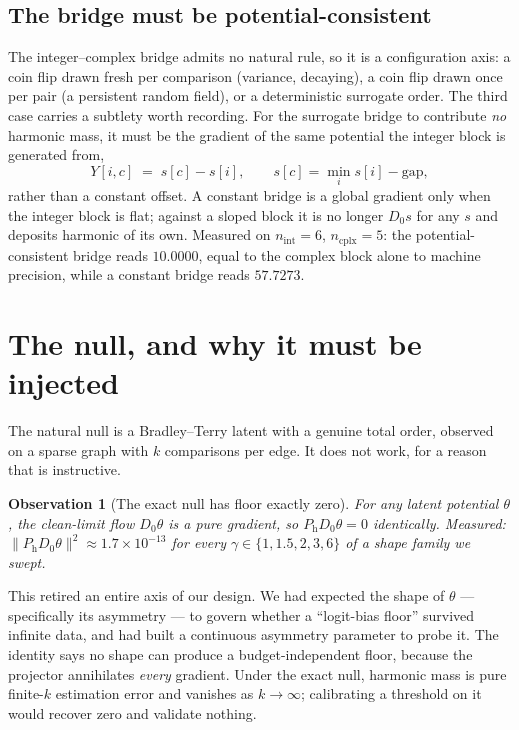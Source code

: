 \documentclass[11pt,a4paper]{article}
\newtheorem{observation}{Observation}
\newcommand{\Ph}{P_{\mathrm{h}}}
\begin{document}
\subsection{The bridge must be potential-consistent}\label{subsec:bridgepc}

The integer--complex bridge admits no natural rule, so it is a configuration
axis: a coin flip drawn fresh per comparison (variance, decaying), a coin flip
drawn once per pair (a persistent random field), or a deterministic surrogate
order. The third case carries a subtlety worth recording. For the surrogate
bridge to contribute \emph{no} harmonic mass, it must be the gradient of the same
potential the integer block is generated from,
\[
Y[i,c] \;=\; s[c] - s[i], \qquad s[c] = \min_i s[i] - \text{gap},
\]
rather than a constant offset. A constant bridge is a global gradient only when
the integer block is flat; against a sloped block it is no longer $D_0 s$ for any
$s$ and deposits harmonic of its own. Measured on $n_{\mathrm{int}}=6$,
$n_{\mathrm{cplx}}=5$: the potential-consistent bridge reads $10.0000$, equal to
the complex block alone to machine precision, while a constant bridge reads
$57.7273$.

\section{The null, and why it must be injected}\label{sec:null}

The natural null is a Bradley--Terry latent with a genuine total order, observed
on a sparse graph with $k$ comparisons per edge. It does not work, for a reason
that is instructive.

\begin{observation}[The exact null has floor exactly zero]
For any latent potential $\theta$, the clean-limit flow $D_0\theta$ is a pure
gradient, so $\Ph D_0\theta = 0$ identically. Measured:
$\|\Ph D_0\theta\|^2 \approx 1.7\times 10^{-13}$ for every
$\gamma\in\{1,1.5,2,3,6\}$ of a shape family we swept.
\end{observation}

This retired an entire axis of our design. We had expected the shape of $\theta$
--- specifically its asymmetry --- to govern whether a ``logit-bias floor''
survived infinite data, and had built a continuous asymmetry parameter to probe
it. The identity says no shape can produce a budget-independent floor, because
the projector annihilates \emph{every} gradient. Under the exact null, harmonic
mass is pure finite-$k$ estimation error and vanishes as $k\to\infty$; calibrating
a threshold on it would recover zero and validate nothing.
\end{document}
